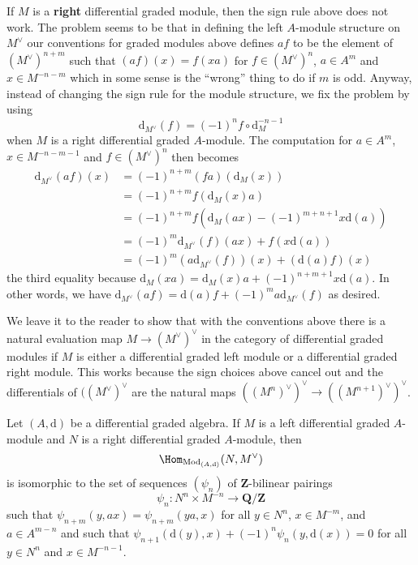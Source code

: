 \medskip\noindent
If $M$ is a {\bf right} differential graded module, then the sign rule above
does not work. The problem seems to be that in defining the left $A$-module
structure on $M^\vee$ our conventions for graded modules above defines $af$
to be the element of $(M^\vee)^{n + m}$ such that $(af)(x) = f(xa)$ for
$f \in (M^\vee)^n$, $a \in A^m$ and $x \in M^{-n - m}$ which in some sense
is the ``wrong'' thing to do if $m$ is odd. Anyway, instead of changing
the sign rule for the module structure, we fix the problem by using
$$
\text{d}_{M^\vee}(f) = (-1)^n f \circ \text{d}_M^{-n - 1}
$$
when $M$ is a right differential graded $A$-module. The computation for
$a \in A^m$, $x \in M^{-n - m - 1}$ and $f \in (M^\vee)^n$ then becomes
\begin{align*}
\text{d}_{M^\vee}(a f)(x) & =
(-1)^{n + m} (f a)(\text{d}_M(x)) \\
& =
(-1)^{n + m} f(\text{d}_M(x)a) \\
& =
(-1)^{n + m} f(\text{d}_M(ax) - (-1)^{m + n + 1} x\text{d}(a)) \\
& =
(-1)^m \text{d}_{M^\vee}(f)(ax) + f(x\text{d}(a)) \\
& =
(-1)^m (a\text{d}_{M^\vee}(f))(x) + (\text{d}(a)f)(x)
\end{align*}
the third equality because
$\text{d}_M(xa) = \text{d}_M(x)a + (-1)^{n + m + 1} x\text{d}(a)$.
In other words, we have
$\text{d}_{M^\vee}(af) = \text{d}(a) f + (-1)^ma\text{d}_{M^\vee}(f)$
as desired.

\medskip\noindent
We leave it to the reader to show that with the conventions above
there is a natural evaluation map $M \to (M^\vee)^\vee$ in the
category of differential graded modules if $M$ is either a differential
graded left module or a differential graded right module. This works
because the sign choices above cancel out and the differentials of
$((M^\vee)^\vee$ are the natural maps
$((M^n)^\vee)^\vee \to ((M^{n + 1})^\vee)^\vee$.

\begin{lemma}
\label{lemma-map-into-dual}
Let $(A, \text{d})$ be a differential graded algebra. If
$M$ is a left differential graded $A$-module and $N$ is a
right differential graded $A$-module, then
$$
\Hom_{\text{Mod}_{(A, \text{d})}}(N, M^\vee)
$$
is isomorphic to the set of sequences $(\psi_n)$ of $\mathbf{Z}$-bilinear
pairings
$$
\psi_n : N^n \times M^{-n} \longrightarrow \mathbf{Q}/\mathbf{Z}
$$
such that $\psi_{n + m}(y, ax) = \psi_{n + m}(ya, x)$ for all
$y \in N^n$, $x \in M^{-m}$, and $a \in A^{m - n}$ and such that
$\psi_{n + 1}(\text{d}(y), x) + (-1)^n \psi_n(y, \text{d}(x)) = 0$
for all $y \in N^n$ and $x \in M^{-n - 1}$.
\end{lemma}

